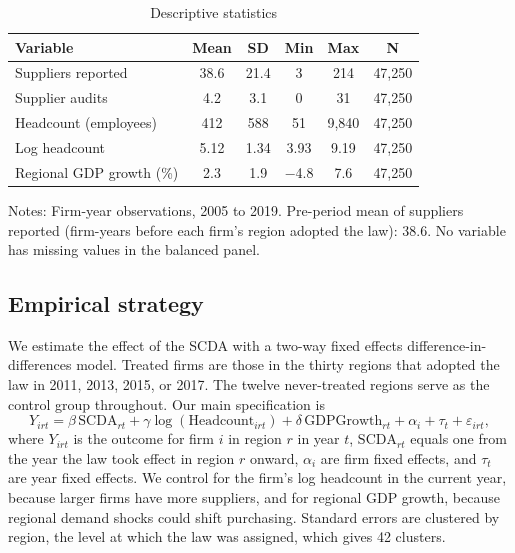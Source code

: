 \documentclass[11pt]{article}
\begin{document}
\begin{table}[ht]
\centering
\begin{threeparttable}
\caption{Descriptive statistics}
\label{tab:desc}
\small
\begin{tabular}{lccccc}
\toprule
Variable & Mean & SD & Min & Max & N \\
\midrule
Suppliers reported & 38.6 & 21.4 & 3 & 214 & 47,250 \\
Supplier audits & 4.2 & 3.1 & 0 & 31 & 47,250 \\
Headcount (employees) & 412 & 588 & 51 & 9,840 & 47,250 \\
Log headcount & 5.12 & 1.34 & 3.93 & 9.19 & 47,250 \\
Regional GDP growth (\%) & 2.3 & 1.9 & $-$4.8 & 7.6 & 47,250 \\
\bottomrule
\end{tabular}
\begin{tablenotes}\footnotesize
\item Notes: Firm-year observations, 2005 to 2019. Pre-period mean of suppliers reported (firm-years before each firm's region adopted the law): 38.6. No variable has missing values in the balanced panel.
\end{tablenotes}
\end{threeparttable}
\end{table}

\subsection{Empirical strategy}

We estimate the effect of the SCDA with a two-way fixed effects difference-in-differences model. Treated firms are those in the thirty regions that adopted the law in 2011, 2013, 2015, or 2017. The twelve never-treated regions serve as the control group throughout. Our main specification is
\begin{equation}
Y_{irt} = \beta \, \text{SCDA}_{rt} + \gamma \log(\text{Headcount}_{irt}) + \delta \, \text{GDPGrowth}_{rt} + \alpha_i + \tau_t + \varepsilon_{irt},
\end{equation}
where $Y_{irt}$ is the outcome for firm $i$ in region $r$ in year $t$, $\text{SCDA}_{rt}$ equals one from the year the law took effect in region $r$ onward, $\alpha_i$ are firm fixed effects, and $\tau_t$ are year fixed effects. We control for the firm's log headcount in the current year, because larger firms have more suppliers, and for regional GDP growth, because regional demand shocks could shift purchasing. Standard errors are clustered by region, the level at which the law was assigned, which gives 42 clusters.
\end{document}
